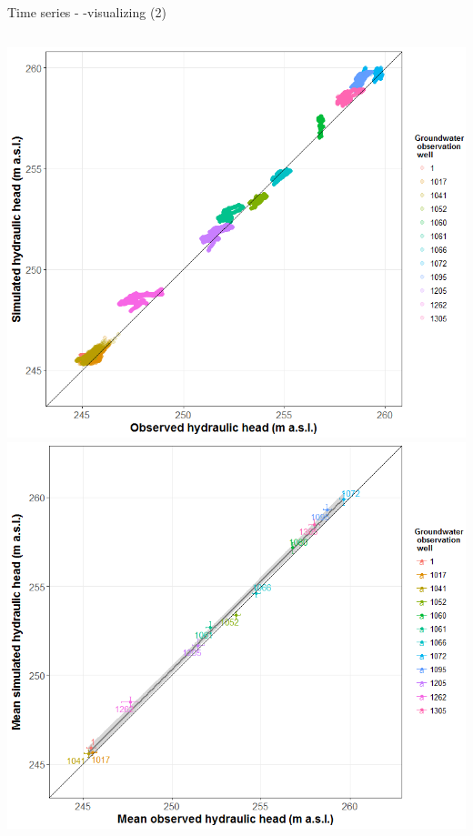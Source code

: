 \documentclass[8pt,ignorenonframetext,]{beamer}
\newcommand{\columnsbegin}{\begin{columns}}
\newcommand{\columnsend}{\end{columns}}
\begin{document}
\begin{frame}{Time series - -visualizing (2)}

\columnsbegin
{}
\includegraphics{imgPres/time_series_head_analysis02.png}
\includegraphics{imgPres/time_series_head_analysis03.png} \columnsend

\end{frame}
\end{document}
